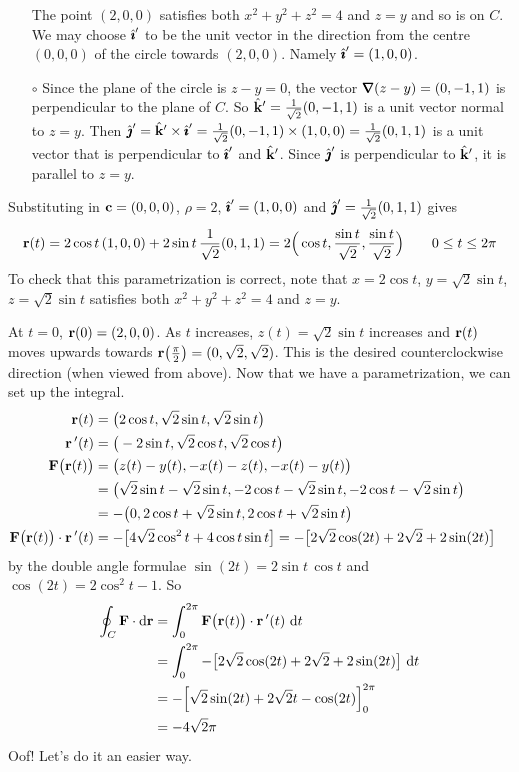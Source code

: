 \begin{eg}
\begin{itemize}
     The point $(2,0,0)$ satisfies both  $x^2+y^2+z^2=4$ and $z=y$ and 
     so is on $C$. We may choose $\hat{\pmb{\imath}}'$ to be the unit vector in the 
     direction from the centre $(0,0,0)$ of the circle towards $(2,0,0)$. 
     Namely $\hat{\pmb{\imath}}'=(1,0,0)$. 
     \item[$\circ$]
     Since the plane of the circle is $z-y=0$, the 
     vector $\vnabla(z-y)=(0,-1,1)$ is perpendicular to the plane of 
     $C$. So  $\hat{\mathbf{k}}'=\frac{1}{\sqrt{2}}(0,-1,1)$ is a unit vector normal 
     to $z=y$. Then 
      $\hat{\pmb{\jmath}}'=\hat{\mathbf{k}}'\times\hat{\pmb{\imath}}'=\frac{1}{\sqrt{2}}(0,-1,1)\times(1,0,0)
      =\frac{1}{\sqrt{2}}(0,1,1)$ is a unit vector that is 
      perpendicular to $\hat{\pmb{\imath}}'$ and $\hat{\mathbf{k}}'$.
     Since $\hat{\pmb{\jmath}}'$ is perpendicular to $\hat{\mathbf{k}}'$, it is parallel to $z=y$.
     \end{itemize}
Substituting in $\mathbf{c}=(0,0,0)$, $\rho=2$, $\hat{\pmb{\imath}}'=(1,0,0)$ and 
$\hat{\pmb{\jmath}}'=\frac{1}{\sqrt{2}}(0,1,1)$ gives
\begin{equation*}
\mathbf{r}(t)=2\cos t\,(1,0,0)+ 2\sin t\,\frac{1}{\sqrt{2}}(0,1,1)
=2\Big(\cos t, \frac{\sin t}{\sqrt{2}},\frac{\sin t}{\sqrt{2}}\Big)
\qquad 0\le t\le 2\pi
\end{equation*}
To check that this parametrization is correct, note that 
$x=2\cos t$, $y=\sqrt{2}\sin t$, $z=\sqrt{2}\sin t$ satisfies both 
$x^2+y^2+z^2=4$ and $z=y$. 

At $t=0$, $\mathbf{r}(0)=(2,0,0)$. As $t$ increases,
$z(t)=\sqrt{2}\sin t$ increases and $\mathbf{r}(t)$ moves upwards towards 
$\mathbf{r}\big(\frac{\pi}{2}\big)=(0,\sqrt{2},\sqrt{2})$.
This is the desired counterclockwise direction (when viewed from above). Now that we have a 
parametrization, we can set up the integral.
\begin{align*}
\mathbf{r}(t)&=\big(2\cos t, \sqrt{2}\sin t,\sqrt{2}\sin t\big)\cr
\mathbf{r}\,'(t)&=\big(-2\sin t,\sqrt{2}\cos t,\sqrt{2}\cos t\big)\cr
\mathbf{F}\big(\mathbf{r}(t)\big)&=\big(z(t)-y(t),-x(t)-z(t),-x(t)-y(t)\big)\cr
&=\big(\sqrt{2}\sin t-\sqrt{2}\sin t,
              -2\cos t-\sqrt{2}\sin t,-2\cos t-\sqrt{2}\sin t\big)\cr
&=-\big(0, 2\cos t+\sqrt{2}\sin t,2\cos t+\sqrt{2}\sin t\big)\cr
\mathbf{F}\big(\mathbf{r}(t)\big)\cdot \mathbf{r}\,'(t)
&=-\big[4\sqrt{2}\cos^2 t+4\cos t\sin t\big]
=-\big[2\sqrt{2}\cos(2t)+2\sqrt{2}+2\sin(2t)\big]
\end{align*}
by the double angle formulae $\sin(2t)=2\sin t\,\cos t$ and
$\cos(2t) = 2\cos^2t-1$. So
\begin{align*}
\oint_C\vF\cdot \dee{\vr}
&=\int_0^{2\pi}\vF\big(\vr(t)\big)\cdot \vr\,'(t)\ \dee{t}\\
&=\int_0^{2\pi}-\big[2\sqrt{2}\cos(2t)+2\sqrt{2}+2\sin(2t)\big]\ \dee{t}\\
&=-\Big[\sqrt{2}\sin(2t)+2\sqrt{2}t-\cos(2t)\Big]_0^{2\pi}\\
&=-4\sqrt{2}\pi
\end{align*}
Oof! Let's do it an easier way.


\end{eg}
